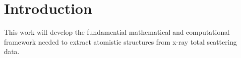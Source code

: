 \chapter*{Introduction}
This work will develop the fundamential mathematical and computational framework needed to extract atomistic structures from x-ray total scattering data.
